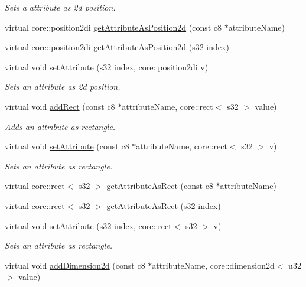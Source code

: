 \begin{DoxyCompactItemize}
\begin{DoxyCompactList}\small\item\em Sets a attribute as 2d position. \end{DoxyCompactList}\item 
virtual core\-::position2di \hyperlink{classirr_1_1io_1_1_c_attributes_ad8ff6cbfa822159cc1f8636f0ac50051}{get\-Attribute\-As\-Position2d} (const c8 $\ast$attribute\-Name)
\item 
virtual core\-::position2di \hyperlink{classirr_1_1io_1_1_c_attributes_ae727f6ca5966cc0f3165de548fe18e9c}{get\-Attribute\-As\-Position2d} (s32 index)
\item 
virtual void \hyperlink{classirr_1_1io_1_1_c_attributes_a997ec5ad9193c9401e579c2ef842767d}{set\-Attribute} (s32 index, core\-::position2di v)
\begin{DoxyCompactList}\small\item\em Sets an attribute as 2d position. \end{DoxyCompactList}\item 
\hypertarget{classirr_1_1io_1_1_c_attributes_a93468a0f67d83992703b19e08a7657c3}{virtual void \hyperlink{classirr_1_1io_1_1_c_attributes_a93468a0f67d83992703b19e08a7657c3}{add\-Rect} (const c8 $\ast$attribute\-Name, core\-::rect$<$ s32 $>$ value)}\label{classirr_1_1io_1_1_c_attributes_a93468a0f67d83992703b19e08a7657c3}

\begin{DoxyCompactList}\small\item\em Adds an attribute as rectangle. \end{DoxyCompactList}\item 
virtual void \hyperlink{classirr_1_1io_1_1_c_attributes_a19744607747c7912ff700957daeee3b3}{set\-Attribute} (const c8 $\ast$attribute\-Name, core\-::rect$<$ s32 $>$ v)
\begin{DoxyCompactList}\small\item\em Sets an attribute as rectangle. \end{DoxyCompactList}\item 
virtual core\-::rect$<$ s32 $>$ \hyperlink{classirr_1_1io_1_1_c_attributes_a65b4ede53ac7969ca9be11a863650887}{get\-Attribute\-As\-Rect} (const c8 $\ast$attribute\-Name)
\item 
virtual core\-::rect$<$ s32 $>$ \hyperlink{classirr_1_1io_1_1_c_attributes_ad42012621b1d384e80c8be1c9587bcd3}{get\-Attribute\-As\-Rect} (s32 index)
\item 
virtual void \hyperlink{classirr_1_1io_1_1_c_attributes_ae099c1e083452a0e5ab566d791f3cbf0}{set\-Attribute} (s32 index, core\-::rect$<$ s32 $>$ v)
\begin{DoxyCompactList}\small\item\em Sets an attribute as rectangle. \end{DoxyCompactList}\item 
\hypertarget{classirr_1_1io_1_1_c_attributes_adbfc479611dc9169cb91f31b2187ce6e}{virtual void \hyperlink{classirr_1_1io_1_1_c_attributes_adbfc479611dc9169cb91f31b2187ce6e}{add\-Dimension2d} (const c8 $\ast$attribute\-Name, core\-::dimension2d$<$ u32 $>$ value)}\label{classirr_1_1io_1_1_c_attributes_adbfc479611dc9169cb91f31b2187ce6e}


\end{DoxyCompactItemize}
